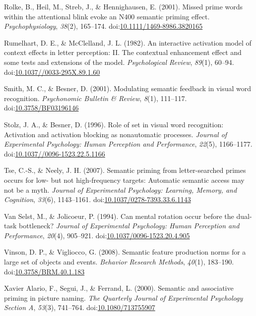 \documentclass[english,man]{apa6}
\theoremstyle{definition}
\theoremstyle{definition}
\theoremstyle{definition}
\theoremstyle{remark}
\begin{document}
\hypertarget{ref-Rolke2001}{}
Rolke, B., Heil, M., Streb, J., \& Hennighausen, E. (2001). Missed prime
words within the attentional blink evoke an N400 semantic priming
effect. \emph{Psychophysiology}, \emph{38}(2), 165--174.
doi:\href{https://doi.org/10.1111/1469-8986.3820165}{10.1111/1469-8986.3820165}

\hypertarget{ref-Rumelhart1982}{}
Rumelhart, D. E., \& McClelland, J. L. (1982). An interactive activation
model of context effects in letter perception: II. The contextual
enhancement effect and some tests and extensions of the model.
\emph{Psychological Review}, \emph{89}(1), 60--94.
doi:\href{https://doi.org/10.1037//0033-295X.89.1.60}{10.1037//0033-295X.89.1.60}

\hypertarget{ref-Smith2001}{}
Smith, M. C., \& Besner, D. (2001). Modulating semantic feedback in
visual word recognition. \emph{Psychonomic Bulletin \& Review},
\emph{8}(1), 111--117.
doi:\href{https://doi.org/10.3758/BF03196146}{10.3758/BF03196146}

\hypertarget{ref-Stolz1996a}{}
Stolz, J. A., \& Besner, D. (1996). Role of set in visual word
recognition: Activation and activation blocking as nonautomatic
processes. \emph{Journal of Experimental Psychology: Human Perception
and Performance}, \emph{22}(5), 1166--1177.
doi:\href{https://doi.org/10.1037//0096-1523.22.5.1166}{10.1037//0096-1523.22.5.1166}

\hypertarget{ref-Tse2007}{}
Tse, C.-S., \& Neely, J. H. (2007). Semantic priming from
letter-searched primes occurs for low- but not high-frequency targets:
Automatic semantic access may not be a myth. \emph{Journal of
Experimental Psychology: Learning, Memory, and Cognition}, \emph{33}(6),
1143--1161.
doi:\href{https://doi.org/10.1037/0278-7393.33.6.1143}{10.1037/0278-7393.33.6.1143}

\hypertarget{ref-VanSelst1994}{}
Van Selst, M., \& Jolicoeur, P. (1994). Can mental rotation occur before
the dual-task bottleneck? \emph{Journal of Experimental Psychology:
Human Perception and Performance}, \emph{20}(4), 905--921.
doi:\href{https://doi.org/10.1037/0096-1523.20.4.905}{10.1037/0096-1523.20.4.905}

\hypertarget{ref-Vinson2008}{}
Vinson, D. P., \& Vigliocco, G. (2008). Semantic feature production
norms for a large set of objects and events. \emph{Behavior Research
Methods}, \emph{40}(1), 183--190.
doi:\href{https://doi.org/10.3758/BRM.40.1.183}{10.3758/BRM.40.1.183}

\hypertarget{ref-XavierAlario2000}{}
Xavier Alario, F., Segui, J., \& Ferrand, L. (2000). Semantic and
associative priming in picture naming. \emph{The Quarterly Journal of
Experimental Psychology Section A}, \emph{53}(3), 741--764.
doi:\href{https://doi.org/10.1080/713755907}{10.1080/713755907}
\end{document}
